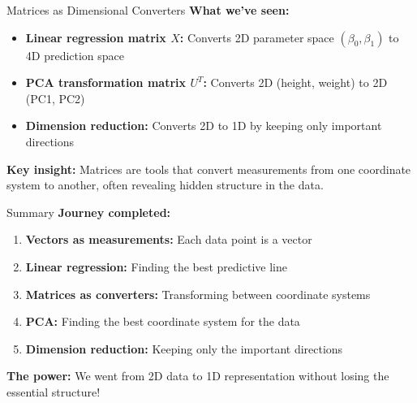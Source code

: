 \documentclass[aspectratio=169]{beamer}
\begin{document}
\begin{frame}{Matrices as Dimensional Converters}
\textbf{What we've seen:}

\vspace{1em}
\begin{itemize}
    \item \textbf{Linear regression matrix $X$:} Converts 2D parameter space $(\beta_0, \beta_1)$ to 4D prediction space
    \item \textbf{PCA transformation matrix $U^T$:} Converts 2D (height, weight) to 2D (PC1, PC2) 
    \item \textbf{Dimension reduction:} Converts 2D to 1D by keeping only important directions
\end{itemize}

\vspace{1em}
\textbf{Key insight:} Matrices are tools that convert measurements from one coordinate system to another, often revealing hidden structure in the data.
\end{frame}

\begin{frame}{Summary}
\textbf{Journey completed:}
\begin{enumerate}
    \item \textbf{Vectors as measurements:} Each data point is a vector
    \item \textbf{Linear regression:} Finding the best predictive line
    \item \textbf{Matrices as converters:} Transforming between coordinate systems  
    \item \textbf{PCA:} Finding the best coordinate system for the data
    \item \textbf{Dimension reduction:} Keeping only the important directions
\end{enumerate}

\vspace{1em}
\textbf{The power:} We went from 2D data to 1D representation without losing the essential structure!
\end{frame}
\end{document}
